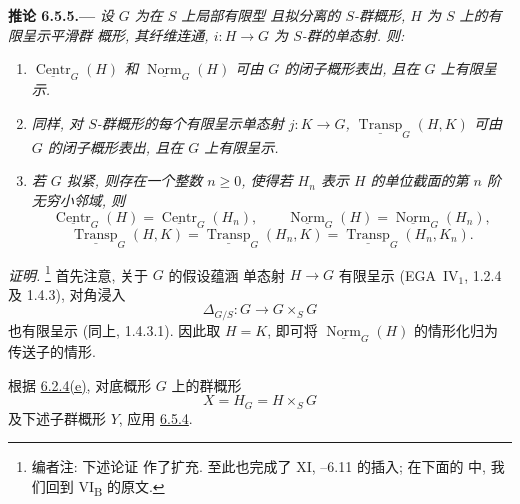
\medskip
{}\label{cor:sga3-VIB-6.5.5}%
\noindent\textbf{推论 6.5.5.---}
\emph{设 \(G\) 为在 \(S\) 上局部有限型
且拟分离的 \(S\)-群概形, \(H\) 为 \(S\) 上的有限呈示平滑群
概形, 其纤维连通,
\(i:H\to G\) 为 \(S\)-群的单态射. 则:}
\begin{enumerate}
\item[\textup{a)}]\label{concl:sga3-VIB-6.5.5-a}
  \emph{\(\underline{\operatorname{Centr}}_G(H)\) 和
  \(\underline{\operatorname{Norm}}_G(H)\) 可由
  \(G\) 的闭子概形表出, 且在 \(G\) 上有限呈示.}
\item[\textup{a\(^{\prime}\))}]
  \label{concl:sga3-VIB-6.5.5-aprime}
  \emph{同样, 对 \(S\)-群概形的每个有限呈示单态射 \(j:K\to G\),
  \(\underline{\operatorname{Transp}}_G(H,K)\) 可由
  \(G\) 的闭子概形表出, 且在
  \(G\) 上有限呈示.}
\item[\textup{b)}]\label{concl:sga3-VIB-6.5.5-b}
  \emph{若 \(G\) 拟紧, 则存在一个整数
  \(n\geq 0\), 使得若 \(H_n\) 表示 \(H\) 的单位截面的第 \(n\) 阶
  无穷小邻域, 则}
  \[
    \underline{\operatorname{Centr}}_G(H)
      =\underline{\operatorname{Centr}}_G(H_n),
    \qquad
    \underline{\operatorname{Norm}}_G(H)
      =\underline{\operatorname{Norm}}_G(H_n),
  \]
  \[
    \underline{\operatorname{Transp}}_G(H,K)
      =\underline{\operatorname{Transp}}_G(H_n,K)
      =\underline{\operatorname{Transp}}_G(H_n,K_n).
  \]
\end{enumerate}

\emph{证明.}%
\footnote{\label{note:sga3-VIB-66}编者注: 下述论证
作了扩充. 至此也完成了 XI,
--6.11 的插入; 在下面的  中,
我们回到 VI\textsubscript{B} 的原文.}
首先注意, 关于 \(G\) 的假设蕴涵
单态射 \(H\to G\) 有限呈示
(EGA~IV\(_1\), 1.2.4 及 1.4.3), 对角浸入
\[
  \Delta_{G/S}:G\longrightarrow G\times_S G
\]
也有限呈示 (同上, 1.4.3.1).
因此取 \(H=K\), 即可将
\(\underline{\operatorname{Norm}}_G(H)\) 的情形化归为
传送子的情形.

根据 \hyperref[ex:sga3-VIB-6.2.4-e]{6.2.4\textup{(e)}},
对底概形 \(G\) 上的群概形
\[
  X=H_G=H\times_S G
\]
及下述子群概形 \(Y\),
应用 \hyperref[cor:sga3-VIB-6.5.4]{6.5.4}.

